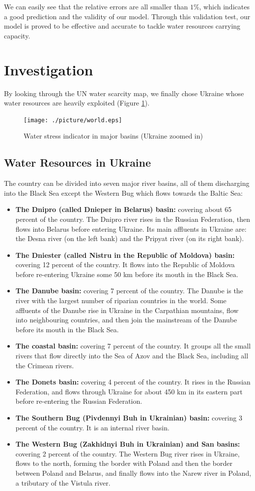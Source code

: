 We can easily see that the relative errors are all smaller than $1\%$, which indicates a good prediction and the validity of our model. Through this validation test, our model is proved to be effective and accurate to tackle water resources carrying capacity.
\section{Investigation}
By looking through the UN water scarcity map, we finally chose Ukraine whose water resources are heavily exploited (Figure \ref{world}).
\begin{figure}[!htbp]
\small
\centering
\texttt{[image: ./picture/world.eps]}
\caption{Water stress indicator in major basins (Ukraine zoomed in)} \label{world}
\end{figure}
\subsection{Water Resources in Ukraine}
The country can be divided into seven major river basins, all of them discharging into the Black Sea except the Western Bug which flows towards the Baltic Sea:
\begin{itemize}
\item \textbf{The Dnipro (called Dnieper in Belarus) basin:}
covering about 65 percent of the country. The Dnipro river rises in the Russian Federation, then flows into Belarus before entering Ukraine. Its main affluents in Ukraine are: the Desna river (on the left bank) and the Pripyat river (on its right bank).
\item \textbf{The Dniester (called Nistru in the Republic of Moldova) basin:}
covering 12 percent of the country. It flows into the Republic of Moldova before re-entering Ukraine some 50 km before its mouth in the Black Sea.
\item \textbf{The Danube basin:}
covering 7 percent of the country. The Danube is the river with the largest number of riparian countries in the world. Some affluents of the Danube rise in Ukraine in the Carpathian mountains, flow into neighbouring countries, and then join the mainstream of the Danube before its mouth in the Black Sea.
\item \textbf{The coastal basin:}
covering 7 percent of the country. It groups all the small rivers that flow directly into the Sea of Azov and the Black Sea, including all the Crimean rivers.
\item \textbf{The Donets basin:}
covering 4 percent of the country. It rises in the Russian Federation, and flows through Ukraine for about 450 km in its eastern part before re-entering the Russian Federation.
\item \textbf{The Southern Bug (Pivdennyi Buh in Ukrainian) basin:}
covering 3 percent of the country. It is an internal river basin.
\item \textbf{The Western Bug (Zakhidnyi Buh in Ukrainian) and San basins:}
covering 2 percent of the country. The Western Bug river rises in Ukraine, flows to the north, forming the border with Poland and then the border between Poland and Belarus, and finally flows into the Narew river in Poland, a tributary of the Vistula river.
\end{itemize}

